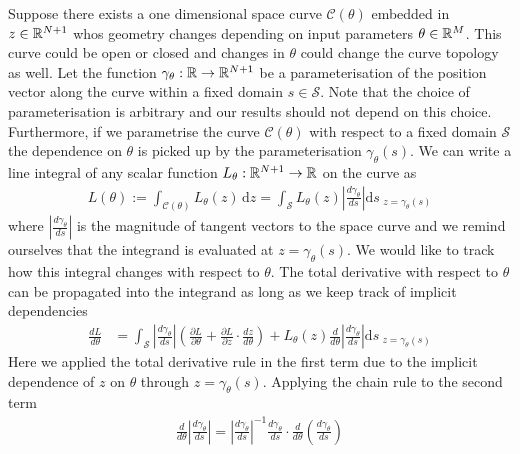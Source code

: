 Suppose there exists a one dimensional space curve $\mathcal{C(\theta)}$ embedded in $z\in\mathbb{R}^{N+1}$ whos geometry changes depending on input parameters $\theta\in\mathbb{R}^M$. This curve could be open or closed and changes in $\theta$ could change the curve topology as well. Let the function $\gamma_{\theta}:\mathbb{R}\rightarrow\mathbb{R}^{N+1}$ be a parameterisation of the position vector along the curve within a fixed domain $s\in\mathcal{S}$. Note that the choice of parameterisation is arbitrary and our results should not depend on this choice. Furthermore, if we parametrise the curve $\mathcal{C}(\theta)$ with respect to a fixed domain $\mathcal{S}$ the dependence on $\theta$ is picked up by the parameterisation $\gamma_{\theta}(s)$. We can write a line integral of any scalar function $L_{\theta}:\mathbb{R}^{N+1}\rightarrow\mathbb{R}$ on the curve as
\begin{align}
    L(\theta):=
    \int_\mathcal{C(\theta)}\! L_{\theta}(z)\,\mathrm{d}z
    =\int_\mathcal{S}\! L_{\theta}(z)\left|\frac{d\gamma_{\theta}}{ds}\right|\mathrm{d}s_{\,\,z=\gamma_{\theta}(s)}
\end{align}
where $\left|\frac{d\gamma_{\theta}}{ds}\right|$ is the magnitude of tangent vectors to the space curve and we remind ourselves that the integrand is evaluated at $z=\gamma_{\theta}(s)$. We would like to track how this integral changes with respect to $\theta$. The total derivative with respect to $\theta$ can be propagated into the integrand \cite{Flanders1973DifferentiationSign} as long as we keep track of implicit dependencies
\begin{align}
    \frac{dL}{d\theta} &=\int_\mathcal{S}
    \left|\frac{d\gamma_{\theta}}{ds}\right|
    \left(
        \frac{\partial L}{\partial\theta}+
        \frac{\partial L}{\partial z}\cdot
        \frac{dz}{d\theta}
    \right)
    +L_{\theta}(z)\frac{d}{d\theta}\left|\frac{d\gamma_{\theta}}{ds}\right|
    \mathrm{d}s_{\,\,z=\gamma_{\theta}(s)}
\end{align}
Here we applied the total derivative rule in the first term due to the implicit dependence of $z$ on $\theta$ through $z=\gamma_{\theta}(s)$. Applying the chain rule to the second term
\begin{align}
    \frac{d}{d\theta}\left|\frac{d\gamma_{\theta}}{ds}\right|=
    \left|\frac{d\gamma_{\theta}}{ds}\right|^{-1}
    \frac{d\gamma_{\theta}}{ds}\cdot\frac{d}{d\theta}
    \left(\frac{d\gamma_{\theta}}{ds}\right)
\end{align}
